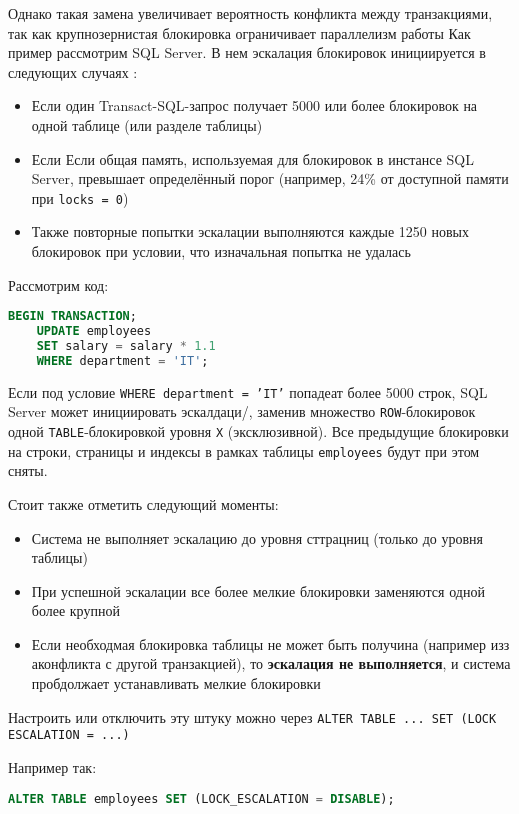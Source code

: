Однако такая замена увеличивает вероятность конфликта между транзакциями, так как крупнозернистая блокировка ограничивает параллелизм работы \autocite{MicrosoftLearnSQLserverTransLock}
Как пример рассмотрим SQL Server. В нем эскалация блокировок инициируется в следующих случаях \autocite{MicrosoftLearnSQLserverTransLock}:
\begin{itemize}
    \item Если один Transact-SQL-запрос получает 5000 или более блокировок на одной таблице (или разделе таблицы)
    \item Если Если общая память, используемая для блокировок в инстансе SQL Server, превышает определённый порог (например, 24\% от доступной памяти при \texttt{locks = 0})
    \item Также повторные попытки эскалации выполняются каждые 1250 новых блокировок при условии, что изначальная попытка не удалась
\end{itemize}

Рассмотрим код:
\begin{lstlisting}[language=SQL]
    BEGIN TRANSACTION;
    UPDATE employees
    SET salary = salary * 1.1
    WHERE department = 'IT';
\end{lstlisting}
Если под условие \texttt{WHERE department = 'IT'} попадеат более 5000 строк, SQL Server может инициировать эскалдаци/, заменив множество \texttt{ROW}-блокировок одной \texttt{TABLE}-блокировкой уровня \texttt{X} (эксклюзивной). Все предыдущие блокировки на строки, страницы и индексы в рамках таблицы \texttt{employees} будут при этом сняты.

Стоит также отметить следующий моменты:
\begin{itemize}
    \item Система не выполняет эскалацию до уровня сттрацниц (только до уровня таблицы)
    \item При успешной эскалации все более мелкие блокировки заменяются одной более крупной
    \item Если необходмая блокировка таблицы не может быть получина (например изз аконфликта с другой транзакцией), то \textbf{эскалация не выполняется}, и система пробдолжает устанавливать мелкие блокировки
\end{itemize}

Настроить или отключить эту штуку можно через \texttt{ALTER TABLE ... SET (LOCK ESCALATION = ...)}

Например так:
\begin{lstlisting}[language=SQL]
    ALTER TABLE employees SET (LOCK_ESCALATION = DISABLE);
\end{lstlisting}

